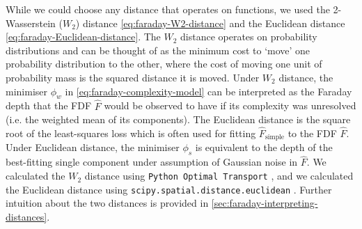     While we could choose any distance that operates on functions, we used the 2-Wasserstein ($W_2$) distance \eqref{eq:faraday-W2-distance} and the Euclidean distance \eqref{eq:faraday-Euclidean-distance}. The $W_2$ distance operates on probability distributions and can be thought of as the minimum cost to `move' one probability distribution to the other, where the cost of moving one unit of probability mass is the squared distance it is moved. Under $W_2$ distance, the minimiser $\phi_w$ in \autoref{eq:faraday-complexity-model} can be interpreted as the Faraday depth that the FDF $\hat F$ would be observed to have if its complexity was unresolved (i.e. the weighted mean of its components). The Euclidean distance is the square root of the least-squares loss which is often used for fitting $\hat{F}_{\mathrm{simple}}$ to the FDF $\hat F$. Under Euclidean distance, the minimiser $\phi_s$ is equivalent to the depth of the best-fitting single component under assumption of Gaussian noise in $\hat F$.
    We calculated the $W_2$ distance using \texttt{Python Optimal Transport} \citep{flamary17pot}, and we calculated the Euclidean distance using \texttt{scipy.spatial.distance.euclidean} \citep{scipy2020}.
    Further intuition about the two distances is provided in \autoref{sec:faraday-interpreting-distances}.

